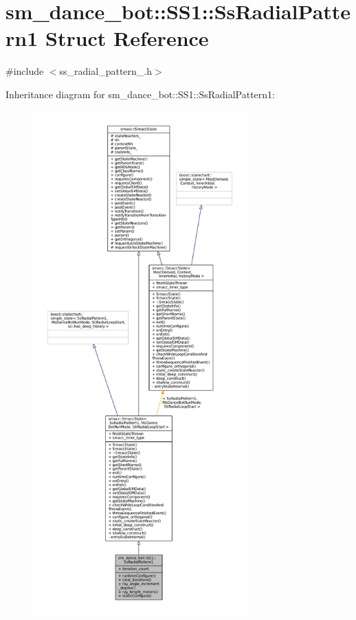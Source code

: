 \hypertarget{structsm__dance__bot_1_1SS1_1_1SsRadialPattern1}{}\section{sm\+\_\+dance\+\_\+bot\+:\+:S\+S1\+:\+:Ss\+Radial\+Pattern1 Struct Reference}
\label{structsm__dance__bot_1_1SS1_1_1SsRadialPattern1}


{\ttfamily \#include $<$ss\+\_\+radial\+\_\+pattern\+\_.\+h$>$}



Inheritance diagram for sm\+\_\+dance\+\_\+bot\+:\+:S\+S1\+:\+:Ss\+Radial\+Pattern1\+:
\nopagebreak
\begin{figure}[H]
\begin{center}
\leavevmode
\includegraphics[height=550pt]{structsm__dance__bot_1_1SS1_1_1SsRadialPattern1__inherit__graph}
\end{center}
\end{figure}


